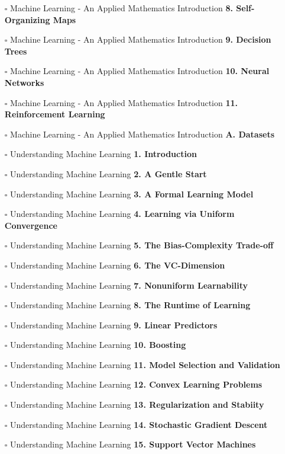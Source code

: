 \documentclass[a4, landscape, 12pt]{article}
\newcommand{\checkbox}{$\square$}%
\begin{document}
\begin{itemize}
{}
\item [\checkbox]  Machine Learning - An Applied Mathematics Introduction \textbf{ 8. Self-Organizing Maps
}
\item [\checkbox]  Machine Learning - An Applied Mathematics Introduction \textbf{ 9. Decision Trees
}
\item [\checkbox]  Machine Learning - An Applied Mathematics Introduction \textbf{ 10. Neural Networks
}
\item [\checkbox]  Machine Learning - An Applied Mathematics Introduction \textbf{ 11. Reinforcement Learning
}
\item [\checkbox]  Machine Learning - An Applied Mathematics Introduction \textbf{ A. Datasets
}
\item [\checkbox]  Understanding Machine Learning \textbf{ 1. Introduction
}
\item [\checkbox]  Understanding Machine Learning \textbf{ 2. A Gentle Start
}
\item [\checkbox]  Understanding Machine Learning \textbf{ 3. A Formal Learning Model
}
\item [\checkbox]  Understanding Machine Learning \textbf{ 4. Learning via Uniform Convergence
}
\item [\checkbox]  Understanding Machine Learning \textbf{ 5. The Bias-Complexity Trade-off
}
\item [\checkbox]  Understanding Machine Learning \textbf{ 6. The VC-Dimension
}
\item [\checkbox]  Understanding Machine Learning \textbf{ 7. Nonuniform Learnability
}
\item [\checkbox]  Understanding Machine Learning \textbf{ 8. The Runtime of Learning
}
\item [\checkbox]  Understanding Machine Learning \textbf{ 9. Linear Predictors
}
\item [\checkbox]  Understanding Machine Learning \textbf{ 10. Boosting
}
\item [\checkbox]  Understanding Machine Learning \textbf{ 11. Model Selection and Validation
}
\item [\checkbox]  Understanding Machine Learning \textbf{ 12. Convex Learning Problems
}
\item [\checkbox]  Understanding Machine Learning \textbf{ 13. Regularization and Stabiity
}
\item [\checkbox]  Understanding Machine Learning \textbf{ 14. Stochastic Gradient Descent
}
\item [\checkbox]  Understanding Machine Learning \textbf{ 15. Support Vector Machines
}
\end{itemize}
\end{document}
